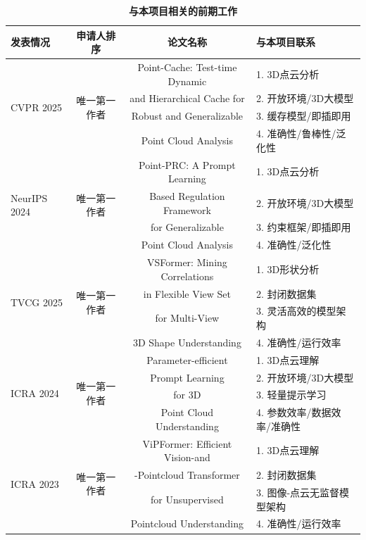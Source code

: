 \documentclass[12pt]{article}
\begin{document}
\begin{table}[ht]
   \footnotesize
   \centering
   \caption{\textbf{与本项目相关的前期工作}}
   \begin{tabular}{l c c l}
      \toprule
      \textbf{发表情况} & \textbf{申请人排序} & \textbf{论文名称} & \textbf{与本项目联系}\\
      \midrule
      \multirow{4}{*}{CVPR 2025} & \multirow{4}{*}{唯一第一作者} & Point-Cache: Test-time Dynamic & 1. 3D点云分析 \\
      & & and Hierarchical Cache for  & 2. 开放环境/3D大模型 \\
      & & Robust and Generalizable & 3. 缓存模型/即插即用 \\
      & & Point Cloud Analysis & 4. 准确性/鲁棒性/泛化性 \\
      \midrule
      \multirow{4}{*}{NeurIPS 2024} & \multirow{4}{*}{唯一第一作者} & Point-PRC: A Prompt Learning   & 1. 3D点云分析 \\
      & & Based Regulation Framework   & 2. 开放环境/3D大模型 \\      
      & & for Generalizable & 3. 约束框架/即插即用 \\
      & & Point Cloud Analysis & 4. 准确性/泛化性 \\
      \midrule
      \multirow{4}{*}{TVCG 2025} & \multirow{4}{*}{唯一第一作者} & VSFormer: Mining Correlations & 1. 3D形状分析 \\
      & & in Flexible View Set & 2. 封闭数据集 \\
      & & for Multi-View & 3. 灵活高效的模型架构 \\
      & & 3D Shape Understanding & 4. 准确性/运行效率 \\
      \midrule
      \multirow{4}{*}{ICRA 2024} & \multirow{4}{*}{唯一第一作者} & Parameter-efficient    & 1. 3D点云理解 \\
      & & Prompt Learning  & 2. 开放环境/3D大模型 \\
      & & for 3D & 3. 轻量提示学习 \\
      & & Point Cloud Understanding & 4. 参数效率/数据效率/准确性 \\
      \midrule
      \multirow{4}{*}{ICRA 2023} & \multirow{4}{*}{唯一第一作者} & ViPFormer: Efficient Vision-and & 1. 3D点云理解 \\
      & & -Pointcloud Transformer  & 2. 封闭数据集 \\
      & & for Unsupervised & 3. 图像-点云无监督模型架构 \\ %
      & & Pointcloud Understanding & 4. 准确性/运行效率 \\
      \bottomrule
   \end{tabular}
   \label{tab:research_foundation}
\end{table}
\end{document}
